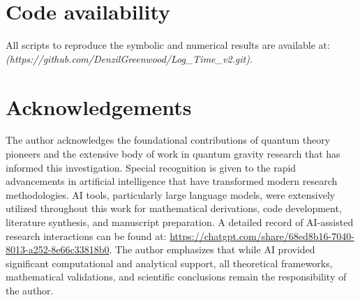 \documentclass[aps,prd,onecolumn,superscriptaddress,nofootinbib]{revtex4-2}
\begin{document}
\section*{Code availability}
All scripts to reproduce the symbolic and numerical results are available at: \emph{(https://github.com/DenzilGreenwood/Log\_Time\_v2.git)}.

\section*{Acknowledgements}
 The author acknowledges the foundational contributions of quantum theory pioneers and the extensive body of work in quantum gravity research that has informed this investigation. Special recognition is given to the rapid advancements in artificial intelligence that have transformed modern research methodologies. AI tools, particularly large language models, were extensively utilized throughout this work for mathematical derivations, code development, literature synthesis, and manuscript preparation. A detailed record of AI-assisted research interactions can be found at: \url{https://chatgpt.com/share/68ed8b16-7040-8013-a252-8e66c33818b0}. The author emphasizes that while AI provided significant computational and analytical support, all theoretical frameworks, mathematical validations, and scientific conclusions remain the responsibility of the author.
\end{document}
